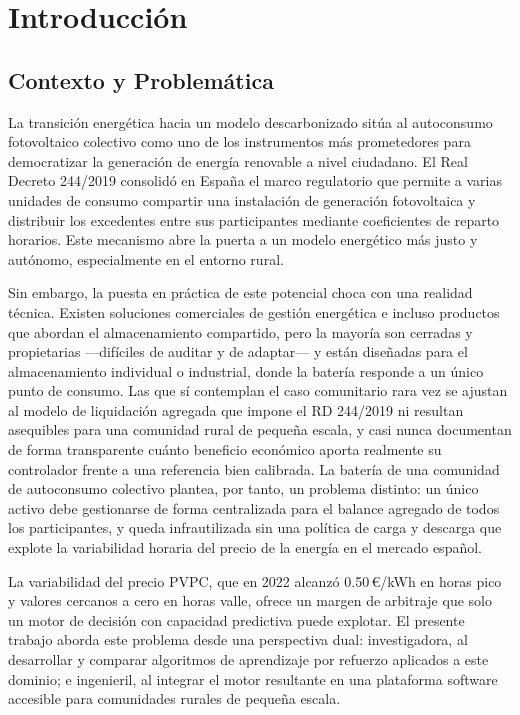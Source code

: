 \documentclass[12pt, a4paper, twoside]{report}
\begin{document}
\chapter{Introducción}
\label{chap:intro}

\section{Contexto y Problemática}

La transición energética hacia un modelo descarbonizado sitúa al autoconsumo
fotovoltaico colectivo como uno de los instrumentos más prometedores para
democratizar la generación de energía renovable a nivel ciudadano. El Real
Decreto 244/2019 consolidó en España el marco regulatorio que permite a varias
unidades de consumo compartir una instalación de generación fotovoltaica y
distribuir los excedentes entre sus participantes mediante coeficientes de
reparto horarios. Este mecanismo abre la puerta a un modelo energético más
justo y autónomo, especialmente en el entorno rural.

Sin embargo, la puesta en práctica de este potencial choca con una realidad
técnica. Existen soluciones comerciales de gestión energética e incluso
productos que abordan el almacenamiento compartido, pero la mayoría son cerradas
y propietarias —difíciles de auditar y de adaptar— y están diseñadas para el
almacenamiento individual o industrial, donde la batería responde a un único
punto de consumo. Las que sí contemplan el caso comunitario rara vez se ajustan
al modelo de liquidación agregada que impone el RD 244/2019 ni resultan
asequibles para una comunidad rural de pequeña escala, y casi nunca documentan
de forma transparente cuánto beneficio económico aporta realmente su controlador
frente a una referencia bien calibrada. La batería de una comunidad de
autoconsumo colectivo plantea, por tanto, un problema distinto: un único activo
debe gestionarse de forma centralizada para el balance agregado de todos los
participantes, y queda infrautilizada sin una política de carga y descarga que
explote la variabilidad horaria del precio de la energía en el mercado español.

La variabilidad del precio PVPC, que en 2022 alcanzó \num{0,50}\,€/kWh en horas
pico y valores cercanos a cero en horas valle, ofrece un margen de arbitraje
que solo un motor de decisión con capacidad predictiva puede explotar. El
presente trabajo aborda este problema desde una perspectiva dual: investigadora,
al desarrollar y comparar algoritmos de aprendizaje por refuerzo aplicados a
este dominio; e ingenieril, al integrar el motor resultante en una plataforma
software accesible para comunidades rurales de pequeña escala.
\end{document}
